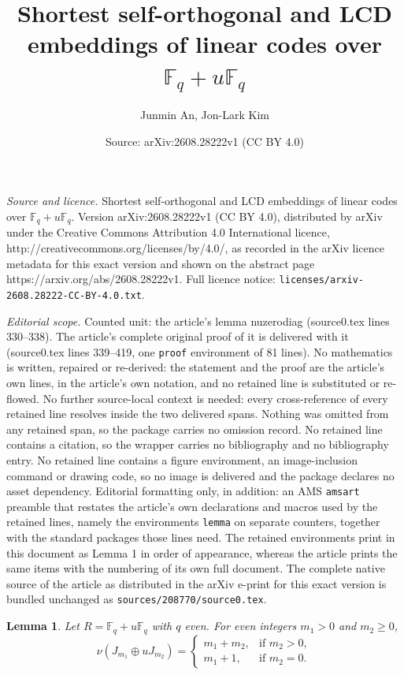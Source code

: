 \documentclass[10pt,a4paper]{amsart}
\title{Shortest self-orthogonal and LCD embeddings of linear codes over $\mathbb{F}_q+u\mathbb{F}_q$}
\author{Junmin An, Jon-Lark Kim}
\date{Source: arXiv:2608.28222v1 (CC BY 4.0)}
\newtheorem{lemma}{Lemma}
\begin{document}
\maketitle

\noindent\emph{Source and licence.} Shortest self-orthogonal and LCD embeddings of linear codes over $\mathbb{F}_q+u\mathbb{F}_q$. Version arXiv:2608.28222v1 (CC BY 4.0), distributed by arXiv under the Creative Commons Attribution 4.0 International licence, http://creativecommons.org/licenses/by/4.0/, as recorded in the arXiv licence metadata for this exact version and shown on the abstract page https://arxiv.org/abs/2608.28222v1. Full licence notice: \texttt{licenses/arxiv-2608.28222-CC-BY-4.0.txt}.\par\smallskip

\noindent\textit{Editorial scope.} Counted unit: the article's lemma nuzerodiag (source0.tex lines 330--338). The article's complete original proof of it is delivered with it (source0.tex lines 339--419, one \texttt{proof} environment of 81 lines). No mathematics is written, repaired or re-derived: the statement and the proof are the article's own lines, in the article's own notation, and no retained line is substituted or re-flowed.  No further source-local context is needed: every cross-reference of every retained line resolves inside the two delivered spans.  Nothing was omitted from any retained span, so the package carries no omission record.  No retained line contains a citation, so the wrapper carries no bibliography and no bibliography entry.  No retained line contains a figure environment, an image-inclusion command or drawing code, so no image is delivered and the package declares no asset dependency.  Editorial formatting only, in addition: an AMS \texttt{amsart} preamble that restates the article's own declarations and macros used by the retained lines, namely the environments \texttt{lemma} on separate counters, together with the standard packages those lines need.  The retained environments print in this document as Lemma 1 in order of appearance, whereas the article prints the same items with the numbering of its own full document.  The complete native source of the article as distributed in the arXiv e-print for this exact version is bundled unchanged as \texttt{sources/208770/source0.tex}.
\begin{lemma}\label{nuzerodiag}
    Let $R=\mathbb{F}_q+u\mathbb{F}_q$ with $q$ even. For even integers $m_1> 0$ and $m_2\ge 0$,
    \[
    \nu(J_{m_1}\oplus uJ_{m_2})=\begin{cases}
        m_1+m_2, & \mbox{if }m_2>0,\\
        m_1+1, & \mbox{if }m_2=0.
    \end{cases}
    \]
\end{lemma}
\end{document}

